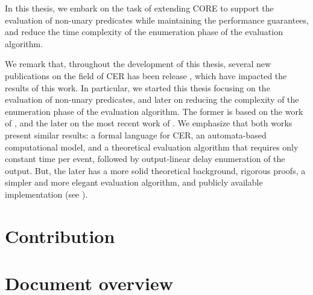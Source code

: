 In this thesis, we embark on the task of extending CORE to support the evaluation of non-unary predicates while maintaining the performance guarantees, and reduce the time complexity of the enumeration phase of the evaluation algorithm.

We remark that, throughout the development of this thesis, several new publications on the field of CER has been release \cite{formal-framework-cer, core}, which have impacted the results of this work. In particular, we started this thesis focusing on the evaluation of non-unary predicates, and later on reducing the complexity of the enumeration phase of the evaluation algorithm. The former is based on the work of \cite{formal-framework-cep, on-the-expressiveness}, and the later on the most recent work of \cite{formal-framework-cer, core}. We emphasize that both works present similar results: a formal language for CER, an automata-based computational model, and a theoretical evaluation algorithm that requires only constant time per event, followed by output-linear delay enumeration of the output. But, the later has a more solid theoretical background, rigorous proofs, a simpler and more elegant evaluation algorithm, and publicly available implementation (see \cite{core-repo}).

\section{Contribution}
\label{sec:contribution}



\section{Document overview}
\label{sec:document_overview}

